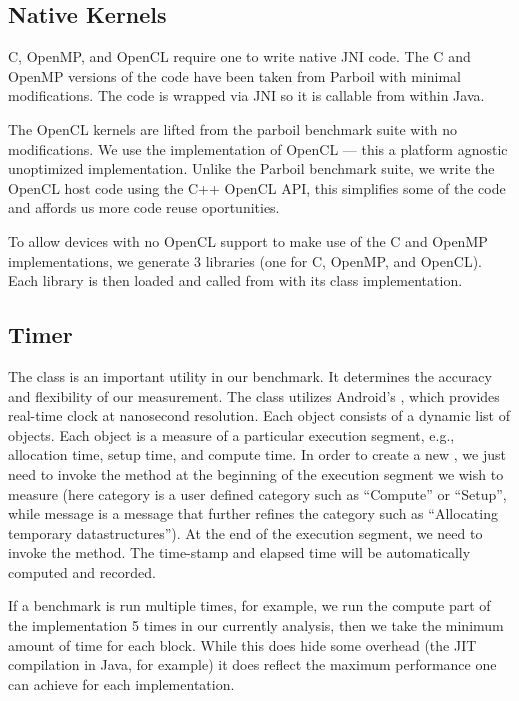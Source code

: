 \subsection{Native Kernels}

C, OpenMP, and OpenCL require one to write native JNI code.
The C and OpenMP versions of the code have been taken from Parboil with minimal modifications.
The code is wrapped via JNI so it is callable from within Java.

The OpenCL kernels are lifted from the parboil benchmark suite with no modifications.
We use the  implementation of OpenCL --- this a platform agnostic unoptimized implementation.
Unlike the Parboil benchmark suite, we write the OpenCL host code using the C++ OpenCL API, this
simplifies some of the code and affords us more code reuse oportunities.

To allow devices with no OpenCL support to make use of the C and OpenMP implementations, 
we generate 3 libraries (one for C, OpenMP, and OpenCL).
Each library is then loaded and called from with its class implementation.

\subsection{Timer}
The  class is an important utility in our benchmark. It
determines the accuracy and flexibility of our measurement. The 
class utilizes Android's , which provides real-time clock at
nanosecond resolution. Each  object consists of a dynamic list of
 objects. Each  object is a measure of a
particular execution segment, e.g., allocation time, setup time, and compute
time. In order to create a new , we just need to invoke the
 method at the beginning of the execution
segment we wish to measure (here category is a user defined category such as
``Compute'' or ``Setup'', while message is a message that further refines the
category such as ``Allocating temporary datastructures''). At the end of the
execution segment, we need to invoke the  method. The
time-stamp and elapsed time will be automatically computed and recorded.

If a benchmark is run multiple times, for example, we run the compute part of
the implementation 5 times in our currently analysis, then we take the minimum amount of time
for each block. While this does hide some overhead (the JIT compilation in Java, for example) 
it does reflect the maximum performance one can achieve for each implementation.

